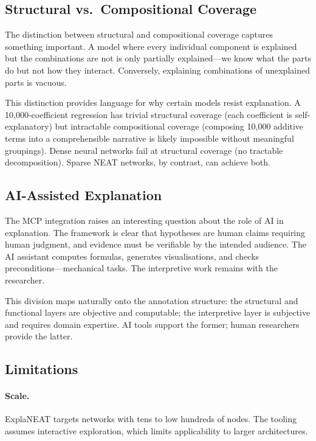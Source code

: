 \documentclass[11pt]{article}
\begin{document}
\subsection{Structural vs.\ Compositional Coverage}

The distinction between structural and compositional coverage captures something important. A model where every individual component is explained but the combinations are not is only partially explained---we know what the parts do but not how they interact. Conversely, explaining combinations of unexplained parts is vacuous.

This distinction provides language for why certain models resist explanation. A 10,000-coefficient regression has trivial structural coverage (each coefficient is self-explanatory) but intractable compositional coverage (composing 10,000 additive terms into a comprehensible narrative is likely impossible without meaningful groupings). Dense neural networks fail at structural coverage (no tractable decomposition). Sparse NEAT networks, by contrast, can achieve both.

\subsection{AI-Assisted Explanation}

The MCP integration raises an interesting question about the role of AI in explanation. The framework is clear that hypotheses are human claims requiring human judgment, and evidence must be verifiable by the intended audience. The AI assistant computes formulas, generates visualisations, and checks preconditions---mechanical tasks. The interpretive work remains with the researcher.

This division maps naturally onto the annotation structure: the structural and functional layers are objective and computable; the interpretive layer is subjective and requires domain expertise. AI tools support the former; human researchers provide the latter.

\subsection{Limitations}

\paragraph{Scale.} ExplaNEAT targets networks with tens to low hundreds of nodes. The tooling assumes interactive exploration, which limits applicability to larger architectures.
\end{document}
